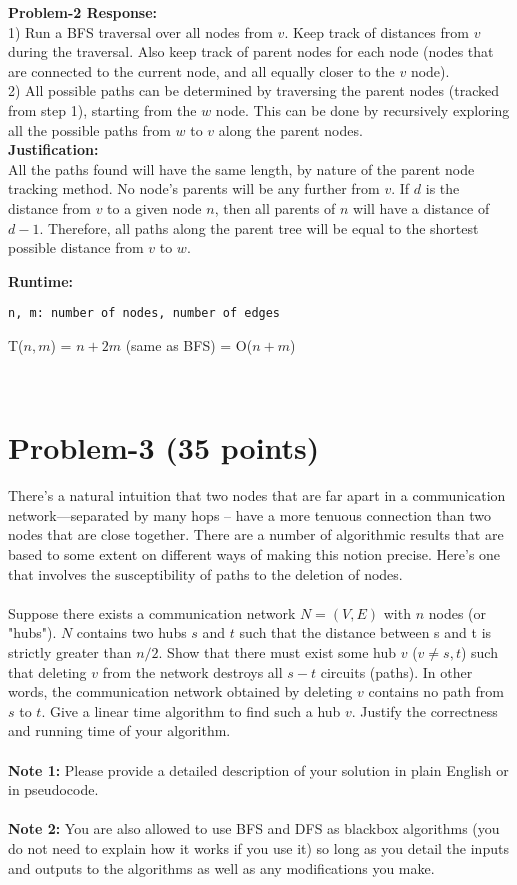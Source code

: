 \documentclass[11pt]{article}
\begin{document}
\noindent \textbf{Problem-2 Response:}\\

1) Run a BFS traversal over all nodes from $v$. Keep track of distances from $v$ during the traversal. Also keep track of parent nodes for each node (nodes that are connected to the current node, and all equally closer to the $v$ node). \\

2) All possible paths can be determined by traversing the parent nodes (tracked from step 1), starting from the $w$ node. This can be done by recursively exploring all the possible paths from $w$ to $v$ along the parent nodes.\\

\noindent \textbf{Justification:}\\
All the paths found will have the same length, by nature of the parent node tracking method. No node's parents will be any further from $v$. If $d$ is the distance from $v$ to a given node $n$, then all parents of $n$ will have a distance of $d-1$. Therefore, all paths along the parent tree will be equal to the shortest possible distance from $v$ to $w$.

\bigskip
\noindent \textbf{Runtime:}
\begin{verbatim}n, m: number of nodes, number of edges\end{verbatim}
T($n, m$) = $n + 2m$ (same as BFS)
\newline = O($n + m$)



​
\newpage
\section*{Problem-3 (35 points)}
\noindent
There’s a natural intuition that two nodes that are far apart in a communication network—separated by many hops -- have a more tenuous connection than two nodes that are close together. There are a number of algorithmic results that are based to some extent on different ways of making this notion precise. Here’s one that involves the susceptibility of paths to the deletion of nodes. \\ \\ 
\noindent
Suppose there exists a communication network $N = (V , E)$ with $n$ nodes (or "hubs"). $N$ contains two hubs $s$ and $t$ such that the distance between s and t is strictly greater than $n/2$. Show that there must exist some hub $v$ ($v \neq s, t$) such that deleting $v$ from the network destroys all $s-t$ circuits (paths). In other words, the communication network obtained by deleting $v$ contains no path from $s$ to $t$. Give a linear time algorithm to find such a hub $v$. Justify the correctness and running time of your algorithm.\\ \\\textbf{Note 1:} Please provide a detailed description of your solution in plain English or in pseudocode. \\ \\
\textbf{Note 2:} You are also allowed to use BFS and DFS as blackbox algorithms (you do not need to explain how it works if you use it) so long as you detail the inputs and outputs to the algorithms as well as any modifications you make.​
\end{document}
